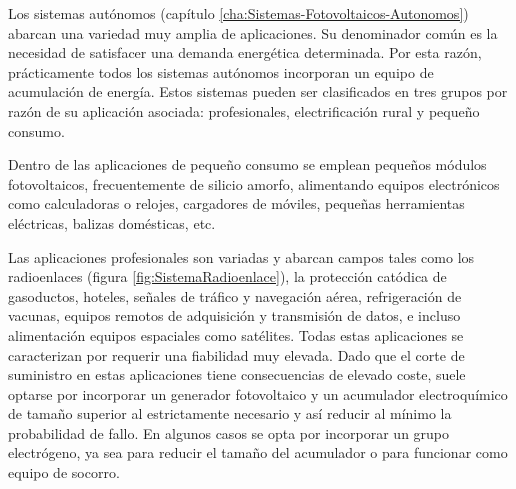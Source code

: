 Los sistemas autónomos (capítulo \ref{cha:Sistemas-Fotovoltaicos-Autonomos})
abarcan una variedad muy amplia de aplicaciones. Su denominador común
es la necesidad de satisfacer una demanda energética determinada.
Por esta razón, prácticamente todos los sistemas autónomos incorporan
un equipo de acumulación de energía. Estos sistemas pueden ser clasificados
en tres grupos por razón de su aplicación asociada: profesionales,
electrificación rural y pequeño consumo. 

Dentro de las aplicaciones de pequeño consumo se emplean pequeños
módulos fotovoltaicos, frecuentemente de silicio amorfo, alimentando
equipos electrónicos como calculadoras o relojes, cargadores de móviles,
pequeñas herramientas eléctricas, balizas domésticas, etc. 

Las aplicaciones profesionales son variadas y abarcan campos tales
como los radioenlaces (figura \ref{fig:SistemaRadioenlace}), la protección
catódica de gasoductos, hoteles, señales de tráfico y navegación aérea,
refrigeración de vacunas, equipos remotos de adquisición y transmisión
de datos, e incluso alimentación equipos espaciales como satélites.
Todas estas aplicaciones se caracterizan por requerir una fiabilidad
muy elevada. Dado que el corte de suministro en estas aplicaciones
tiene consecuencias de elevado coste, suele optarse por incorporar
un generador fotovoltaico y un acumulador electroquímico de tamaño
superior al estrictamente necesario y así reducir al mínimo la probabilidad
de fallo. En algunos casos se opta por incorporar un grupo electrógeno,
ya sea para reducir el tamaño del acumulador o para funcionar como
equipo de socorro.

